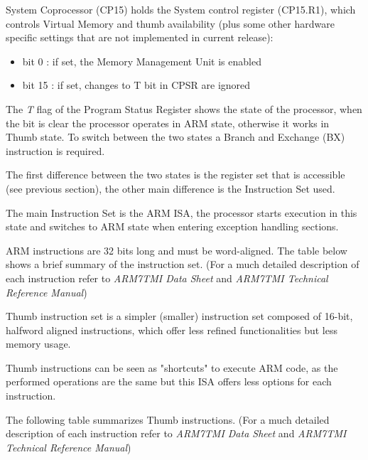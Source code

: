 System Coprocessor (CP15) holds the System control register (CP15.R1), which controls Virtual Memory and thumb availability (plus some other hardware specific settings that are not implemented in current release):

\begin{itemize}
\item bit 0 : if set, the Memory Management Unit is enabled
\item bit 15 : if set, changes to T bit in CPSR are ignored
\end{itemize}


The \emph{T} flag of the Program Status Register shows the state of the processor, when the bit is clear the processor operates in ARM state, otherwise it works in Thumb state. To switch between the two states a Branch and Exchange (BX) instruction is required.

The first difference between the two states is the register set that is accessible (see previous section), the other main difference is the Instruction Set used.


The main Instruction Set is the ARM ISA, the processor starts execution in this state and switches to ARM state when entering exception handling sections.

ARM instructions are 32 bits long and must be word-aligned. The table below shows a brief summary of the instruction set. (For a much detailed description of each instruction refer to \emph{ARM7TMI Data Sheet} and \emph{ARM7TMI Technical Reference Manual})

\vspace{5px}
\begin{adjustbox}{center}

\end{adjustbox}
\vspace{5px}


Thumb instruction set is a simpler (smaller) instruction set composed of 16-bit, halfword aligned instructions, which offer less refined functionalities but less memory usage.

Thumb instructions can be seen as "shortcuts" to execute ARM code, as the performed operations are the same but this ISA offers less options for each instruction.

The following table summarizes Thumb instructions. (For a much detailed description of each instruction refer to \emph{ARM7TMI Data Sheet} and \emph{ARM7TMI Technical Reference Manual})

